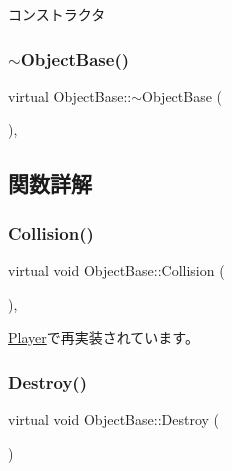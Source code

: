 コンストラクタ 

\mbox{\label{class_object_base_a7074bc9389069351c2d0eee6a47e5ee3}} 
\subsubsection{\texorpdfstring{$\sim$\+Object\+Base()}{~ObjectBase()}}
{\footnotesize\ttfamily virtual Object\+Base\+::$\sim$\+Object\+Base (\begin{DoxyParamCaption}{ }\end{DoxyParamCaption})\hspace{0.3cm}{\ttfamily [inline]}, {\ttfamily [virtual]}}



\subsection{関数詳解}
\mbox{\label{class_object_base_a1991d1c2c214a593feb6b6b24802a8c4}} 
\subsubsection{\texorpdfstring{Collision()}{Collision()}}
{\footnotesize\ttfamily virtual void Object\+Base\+::\+Collision (\begin{DoxyParamCaption}\item[{\mbox{\hyperlink{class_object_base}{Object\+Base}} $\ast$}]{ }\end{DoxyParamCaption})\hspace{0.3cm}{\ttfamily [inline]}, {\ttfamily [virtual]}}



\mbox{\hyperlink{class_player_a660421b69afc7cd6d0d97ea9a28251a2}{Player}}で再実装されています。

\mbox{\label{class_object_base_a7fa4c548153c3af20f89673ffea809af}} 
\subsubsection{\texorpdfstring{Destroy()}{Destroy()}}
{\footnotesize\ttfamily virtual void Object\+Base\+::\+Destroy (\begin{DoxyParamCaption}{ }\end{DoxyParamCaption})\hspace{0.3cm}{\ttfamily [pure virtual]}}



